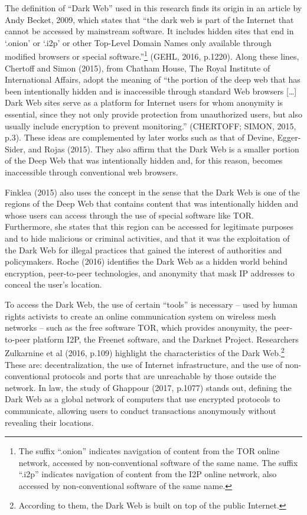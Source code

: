 The definition of ``Dark Web'' used in this research finds its origin in an article by Andy Becket, 2009, which states that ``the dark web is part of the Internet that cannot be accessed by mainstream software. It includes hidden sites that end in `.onion' or `.i2p' or other Top-Level Domain Names only available through modified browsers or special software.''\footnote{The suffix ``.onion'' indicates navigation of content from the TOR online network, accessed by non-conventional software of the same name. The suffix ``.i2p'' indicates navigation of content from the I2P online network, also accessed by non-conventional software of the same name.} (GEHL, 2016, p.1220). Along these lines, Chertoff and Simon (2015), from Chatham House, The Royal Institute of International Affairs, adopt the meaning of ``the portion of the deep web that has been intentionally hidden and is inaccessible through standard Web browsers {[}\ldots{]} Dark Web sites serve as a platform for Internet users for whom anonymity is essential, since they not only provide protection from unauthorized users, but also usually include encryption to prevent monitoring.'' (CHERTOFF; SIMON, 2015, p.3). These ideas are complemented by later works such as that of Devine, Egger-Sider, and Rojas (2015). They also affirm that the Dark Web is a smaller portion of the Deep Web that was intentionally hidden and, for this reason, becomes inaccessible through conventional web browsers.

Finklea (2015) also uses the concept in the sense that the Dark Web is one of the regions of the Deep Web that contains content that was intentionally hidden and whose users can access through the use of special software like TOR. Furthermore, she states that this region can be accessed for legitimate purposes and to hide malicious or criminal activities, and that it was the exploitation of the Dark Web for illegal practices that gained the interest of authorities and policymakers. Roche (2016) identifies the Dark Web as a hidden world behind encryption, peer-to-peer technologies, and anonymity that mask IP addresses to conceal the user's location.

To access the Dark Web, the use of certain ``tools'' is necessary -- used by human rights activists to create an online communication system on wireless mesh networks -- such as the free software TOR, which provides anonymity, the peer-to-peer platform I2P, the Freenet software, and the Darknet Project. Researchers Zulkarnine et al (2016, p.109) highlight the characteristics of the Dark Web.\footnote{According to them, the Dark Web is built on top of the public Internet.} These are: decentralization, the use of Internet infrastructure, and the use of non-conventional protocols and ports that are unreachable by those outside the network. In law, the study of Ghappour (2017, p.1077) stands out, defining the Dark Web as a global network of computers that use encrypted protocols to communicate, allowing users to conduct transactions anonymously without revealing their locations.

